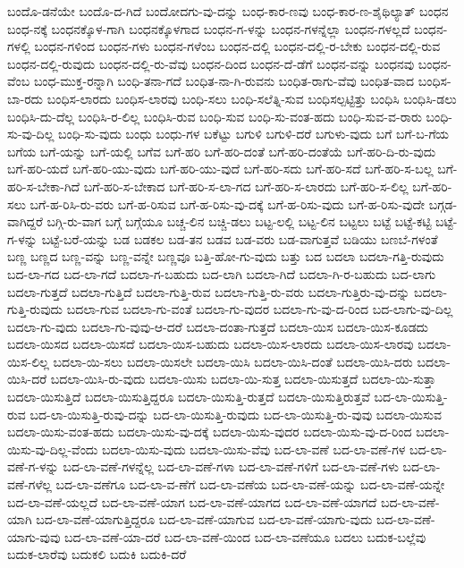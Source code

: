 {ಬಂದೊ-ಡನೆಯೇ
ಬಂದೊ-ದ-ಗಿದೆ
ಬಂದೋದಗು-ವು-ದನ್ನು
ಬಂಧ-ಕಾರ-ಣವು
ಬಂಧ-ಕಾರ-ಣ-ಶೈಥಿಲ್ಯಾತ್
ಬಂಧನ
ಬಂಧ-ನಕ್ಕೆ
ಬಂಧನಕ್ಕೊಳ-ಗಾಗಿ
ಬಂಧನಕ್ಕೊಳಗಾದ
ಬಂಧನ-ಗ-ಳನ್ನು
ಬಂಧನ-ಗಳನ್ನೆಲ್ಲಾ
ಬಂಧನ-ಗಳಲ್ಲದೆ
ಬಂಧನ-ಗಳಲ್ಲಿ
ಬಂಧನ-ಗಳಿಂದ
ಬಂಧನ-ಗಳು
ಬಂಧನ-ಗಳೆಂಬ
ಬಂಧನ-ದಲ್ಲಿ
ಬಂಧನ-ದಲ್ಲಿ-ರ-ಬೇಕು
ಬಂಧನ-ದಲ್ಲಿ-ರುವ
ಬಂಧನ-ದಲ್ಲಿ-ರುವುದು
ಬಂಧನ-ದಲ್ಲಿ-ರು-ವೆವು
ಬಂಧನ-ದಿಂದ
ಬಂಧನ-ದೆ-ಡೆಗೆ
ಬಂಧನ-ವನ್ನು
ಬಂಧನವು
ಬಂಧನ-ವೆಂಬ
ಬಂಧ-ಮುಕ್ತ-ರನ್ನಾಗಿ
ಬಂಧಿ-ತನಾ-ಗದೆ
ಬಂಧಿತ-ನಾ-ಗಿ-ರುವನು
ಬಂಧಿತ-ರಾಗು-ವೆವು
ಬಂಧಿತ-ವಾದ
ಬಂಧಿಸ-ಬಾ-ರದು
ಬಂಧಿಸ-ಲಾರದು
ಬಂಧಿಸ-ಲಾರವು
ಬಂಧಿ-ಸಲು
ಬಂಧಿ-ಸಲೆತ್ನಿ-ಸುವ
ಬಂಧಿಸಲ್ಪಟ್ಟಿತ್ತು
ಬಂಧಿಸಿ
ಬಂಧಿಸಿ-ಡಲು
ಬಂಧಿಸಿ-ದು-ದೆಲ್ಲ
ಬಂಧಿಸಿ-ರ-ಲಿಲ್ಲ
ಬಂಧಿಸಿ-ರುವ
ಬಂಧಿ-ಸುವ
ಬಂಧಿ-ಸು-ವಂತ-ಹದು
ಬಂಧಿ-ಸುವ-ವ-ರಾರು
ಬಂಧಿ-ಸು-ವು-ದಿಲ್ಲ
ಬಂಧಿ-ಸು-ವುದು
ಬಂಧು
ಬಂಧು-ಗಳ
ಬಕೆಟ್ಟು
ಬಗುಳಿ
ಬಗುಳಿ-ದರೆ
ಬಗುಳು-ವುದು
ಬಗೆ
ಬಗೆ-ಬ-ಗೆಯ
ಬಗೆಯ
ಬಗೆ-ಯನ್ನು
ಬಗೆ-ಯಲ್ಲಿ
ಬಗೆವ
ಬಗೆ-ಹರಿ
ಬಗೆ-ಹರಿ-ದಂತೆ
ಬಗೆ-ಹರಿ-ದಂತೆಯೆ
ಬಗೆ-ಹರಿ-ದಿ-ರು-ವುದು
ಬಗೆ-ಹರಿ-ಯದೆ
ಬಗೆ-ಹರಿ-ಯು-ವುದು
ಬಗೆ-ಹರಿ-ಯು-ವುದೆ
ಬಗೆ-ಹರಿ-ಸದು
ಬಗೆ-ಹರಿ-ಸದೆ
ಬಗೆ-ಹರಿ-ಸ-ಬಲ್ಲ
ಬಗೆ-ಹರಿ-ಸ-ಬೇಕಾ-ಗಿದೆ
ಬಗೆ-ಹರಿ-ಸ-ಬೇಕಾದ
ಬಗೆ-ಹರಿ-ಸ-ಲಾ-ಗದ
ಬಗೆ-ಹರಿ-ಸ-ಲಾರದು
ಬಗೆ-ಹರಿ-ಸ-ಲಿಲ್ಲ
ಬಗೆ-ಹರಿ-ಸಲು
ಬಗೆ-ಹ-ರಿಸಿ-ರು-ವರು
ಬಗೆ-ಹ-ರಿಸುವ
ಬಗೆ-ಹ-ರಿಸು-ವು-ದಕ್ಕೆ
ಬಗೆ-ಹ-ರಿಸು-ವುದು
ಬಗೆ-ಹ-ರಿಸು-ವುದೇ
ಬಗ್ಗಡ-ವಾಗಿದ್ದರೆ
ಬಗ್ಗಿ-ರು-ವಾಗ
ಬಗ್ಗೆ
ಬಗ್ಗೆಯೂ
ಬಚ್ಚ-ಲಿನ
ಬಚ್ಚಿ-ಡಲು
ಬಟ್ಟ-ಲಲ್ಲಿ
ಬಟ್ಟ-ಲಿನ
ಬಟ್ಟಲು
ಬಟ್ಟೆ
ಬಟ್ಟೆ-ಕಟ್ಟಿ
ಬಟ್ಟೆ-ಗ-ಳನ್ನು
ಬಟ್ಟೆ-ಬರೆ-ಯನ್ನು
ಬಡ
ಬಡಕಲ
ಬಡ-ತನ
ಬಡವ
ಬಡ-ವರು
ಬಡ-ವಾಗುತ್ತವೆ
ಬಡಿಯು
ಬಣಬೆ-ಗಳಂತೆ
ಬಣ್ಣ
ಬಣ್ಣದ
ಬಣ್ಣ-ವನ್ನು
ಬಣ್ಣ-ವನ್ನೇ
ಬಣ್ಣವೂ
ಬತ್ತಿ-ಹೋ-ಗು-ವುದು
ಬತ್ತು
ಬದ
ಬದಲಾ
ಬದಲಾ-ಗತ್ತಿ-ರುವುದು
ಬದ-ಲಾ-ಗದ
ಬದ-ಲಾ-ಗದೆ
ಬದಲಾ-ಗ-ಬಹುದು
ಬದ-ಲಾಗಿ
ಬದಲಾ-ಗಿದೆ
ಬದಲಾ-ಗಿ-ರ-ಬಹುದು
ಬದ-ಲಾಗು
ಬದಲಾ-ಗುತ್ತದೆ
ಬದಲಾ-ಗುತ್ತಿದೆ
ಬದಲಾ-ಗುತ್ತಿ-ರುವ
ಬದಲಾ-ಗುತ್ತಿ-ರು-ವರು
ಬದಲಾ-ಗುತ್ತಿರು-ವು-ದನ್ನು
ಬದಲಾ-ಗುತ್ತಿ-ರುವುದು
ಬದಲಾ-ಗುವ
ಬದಲಾ-ಗು-ವಂತೆ
ಬದಲಾ-ಗು-ವುದರ
ಬದಲಾ-ಗು-ವು-ದ-ರಿಂದ
ಬದ-ಲಾಗು-ವು-ದಿಲ್ಲ
ಬದಲಾ-ಗು-ವುದು
ಬದಲಾ-ಗು-ವುವು-ಆ-ದರೆ
ಬದಲಾ-ದಂತಾ-ಗುತ್ತದೆ
ಬದಲಾ-ಯಿಸ
ಬದಲಾ-ಯಿಸ-ಕೂಡದು
ಬದಲಾ-ಯಿಸದ
ಬದಲಾ-ಯಿಸದೆ
ಬದಲಾ-ಯಿಸ-ಬಹುದು
ಬದಲಾ-ಯಿಸ-ಲಾರದು
ಬದಲಾ-ಯಿಸ-ಲಾರವು
ಬದಲಾ-ಯಿಸ-ಲಿಲ್ಲ
ಬದಲಾ-ಯಿ-ಸಲು
ಬದಲಾ-ಯಿಸಲೇ
ಬದಲಾ-ಯಿಸಿ
ಬದಲಾ-ಯಿಸಿ-ದಂತೆ
ಬದಲಾ-ಯಿಸಿ-ದರು
ಬದಲಾ-ಯಿಸಿ-ದರೆ
ಬದಲಾ-ಯಿಸಿ-ರು-ವುದು
ಬದಲಾ-ಯಿಸು
ಬದಲಾ-ಯಿ-ಸುತ್ತ
ಬದಲಾ-ಯಿಸುತ್ತದೆ
ಬದಲಾ-ಯಿ-ಸುತ್ತಾ
ಬದಲಾ-ಯಿಸುತ್ತಿದೆ
ಬದಲಾ-ಯಿಸುತ್ತಿದ್ದರೂ
ಬದಲಾ-ಯಿಸುತ್ತಿ-ರುತ್ತದೆ
ಬದಲಾ-ಯಿಸುತ್ತಿರುತ್ತವೆ
ಬದ-ಲಾ-ಯಿಸುತ್ತಿ-ರುವ
ಬದ-ಲಾ-ಯಿಸುತ್ತಿ-ರುವು-ದನ್ನು
ಬದ-ಲಾ-ಯಿಸುತ್ತಿ-ರುವುದು
ಬದ-ಲಾ-ಯಿಸುತ್ತಿ-ರು-ವುವು
ಬದಲಾ-ಯಿಸುವ
ಬದಲಾ-ಯಿಸು-ವಂತ-ಹದು
ಬದಲಾ-ಯಿಸು-ವು-ದಕ್ಕೆ
ಬದಲಾ-ಯಿಸು-ವುದರ
ಬದಲಾ-ಯಿಸು-ವು-ದ-ರಿಂದ
ಬದಲಾ-ಯಿಸು-ವು-ದಿಲ್ಲ-ವೆಂದು
ಬದಲಾ-ಯಿಸು-ವುದು
ಬದಲಾ-ಯಿಸು-ವೆವು
ಬದ-ಲಾ-ವಣೆ
ಬದ-ಲಾ-ವಣೆ-ಗಳ
ಬದ-ಲಾ-ವಣೆ-ಗ-ಳನ್ನು
ಬದ-ಲಾ-ವಣೆ-ಗಳನ್ನೆಲ್ಲ
ಬದ-ಲಾ-ವಣೆ-ಗಳಾ
ಬದ-ಲಾ-ವಣೆ-ಗಳಿಗೆ
ಬದ-ಲಾ-ವಣೆ-ಗಳು
ಬದ-ಲಾ-ವಣೆ-ಗಳೆಲ್ಲ
ಬದ-ಲಾ-ವಣೆಗೂ
ಬದ-ಲಾ-ವ-ಣೆಗೆ
ಬದ-ಲಾ-ವಣೆಯ
ಬದ-ಲಾ-ವಣೆ-ಯನ್ನು
ಬದ-ಲಾ-ವಣೆ-ಯನ್ನೇ
ಬದ-ಲಾ-ವಣೆ-ಯಲ್ಲದೆ
ಬದ-ಲಾ-ವಣೆ-ಯಾಗ
ಬದ-ಲಾ-ವಣೆ-ಯಾಗದ
ಬದ-ಲಾ-ವಣೆ-ಯಾಗದೆ
ಬದ-ಲಾ-ವಣೆ-ಯಾಗಿ
ಬದ-ಲಾ-ವಣೆ-ಯಾಗುತ್ತಿದ್ದರೂ
ಬದ-ಲಾ-ವಣೆ-ಯಾಗುವ
ಬದ-ಲಾ-ವಣೆ-ಯಾಗು-ವುದು
ಬದ-ಲಾ-ವಣೆ-ಯಾಗು-ವುವು
ಬದ-ಲಾ-ವಣೆ-ಯಾ-ದರೆ
ಬದ-ಲಾ-ವಣೆ-ಯಿಂದ
ಬದ-ಲಾ-ವಣೆಯೂ
ಬದಲು
ಬದುಕ-ಬಲ್ಲೆವು
ಬದುಕ-ಲಾರೆವು
ಬದುಕಲಿ
ಬದುಕಿ
ಬದುಕಿ-ದರೆ
}
